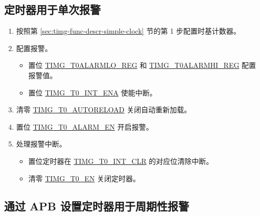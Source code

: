 \documentclass[main\_\_CN.tex]{subfiles}
\begin{document}
\subsection{定时器用于单次报警}\label{sec:timg-func-descr-timer-alarm}
\begin{enumerate}
    \item 按照第 \ref{sec:timg-func-descr-simple-clock} 节的第 1 步配置时基计数器。
    \item 配置报警。
    \begin{itemize}
        \item 置位 \hyperref[regdesc:TIMGTXALARMLOREG]{TIMG\_T0ALARMLO\_REG} 和 \hyperref[regdesc:TIMGTXALARMHIREG]{TIMG\_T0ALARMHI\_REG} 配置报警值。
        \item 置位 \hyperref[fielddesc:TIMGT0INTENA]{TIMG\_T0\_INT\_ENA} 使能中断。
    \end{itemize}
    \item 清零 \hyperref[fielddesc:TIMGTXAUTORELOAD]{TIMG\_T0\_AUTORELOAD} 关闭自动重新加载。
    \item 置位 \hyperref[fielddesc:TIMGTXALARMEN]{TIMG\_T0\_ALARM\_EN} 开启报警。
    \item 处理报警中断。
    \begin{itemize}
        \item 置位定时器在 \hyperref[fielddesc:TIMGT0INTCLR]{TIMG\_T0\_INT\_CLR} 的对应位清除中断。
        \item 清零 \hyperref[fielddesc:TIMGTXEN]{TIMG\_T0\_EN} 关闭定时器。
    \end{itemize}
\end{enumerate}

\subsection{通过 APB 设置定时器用于周期性报警}
\end{document}
